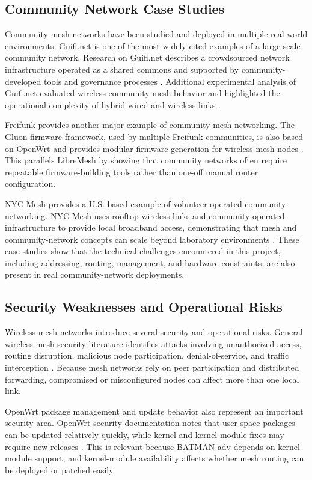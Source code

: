 \documentclass[conference]{IEEEtran}
\begin{document}
\subsection{Community Network Case Studies}

Community mesh networks have been studied and deployed in multiple real-world environments. Guifi.net is one of the most widely cited examples of a large-scale community network. Research on Guifi.net describes a crowdsourced network infrastructure operated as a shared commons and supported by community-developed tools and governance processes \cite{guifinetcommons}. Additional experimental analysis of Guifi.net evaluated wireless community mesh behavior and highlighted the operational complexity of hybrid wired and wireless links \cite{guifinetexperimental}.

Freifunk provides another major example of community mesh networking. The Gluon firmware framework, used by multiple Freifunk communities, is also based on OpenWrt and provides modular firmware generation for wireless mesh nodes \cite{gluon}. This parallels LibreMesh by showing that community networks often require repeatable firmware-building tools rather than one-off manual router configuration.

NYC Mesh provides a U.S.-based example of volunteer-operated community networking. NYC Mesh uses rooftop wireless links and community-operated infrastructure to provide local broadband access, demonstrating that mesh and community-network concepts can scale beyond laboratory environments \cite{nycmeshcase}. These case studies show that the technical challenges encountered in this project, including addressing, routing, management, and hardware constraints, are also present in real community-network deployments.

\subsection{Security Weaknesses and Operational Risks}

Wireless mesh networks introduce several security and operational risks. General wireless mesh security literature identifies attacks involving unauthorized access, routing disruption, malicious node participation, denial-of-service, and traffic interception \cite{wmnsecurity}. Because mesh networks rely on peer participation and distributed forwarding, compromised or misconfigured nodes can affect more than one local link.

OpenWrt package management and update behavior also represent an important security area. OpenWrt security documentation notes that user-space packages can be updated relatively quickly, while kernel and kernel-module fixes may require new releases \cite{openwrtsecurity}. This is relevant because BATMAN-adv depends on kernel-module support, and kernel-module availability affects whether mesh routing can be deployed or patched easily.
\end{document}
